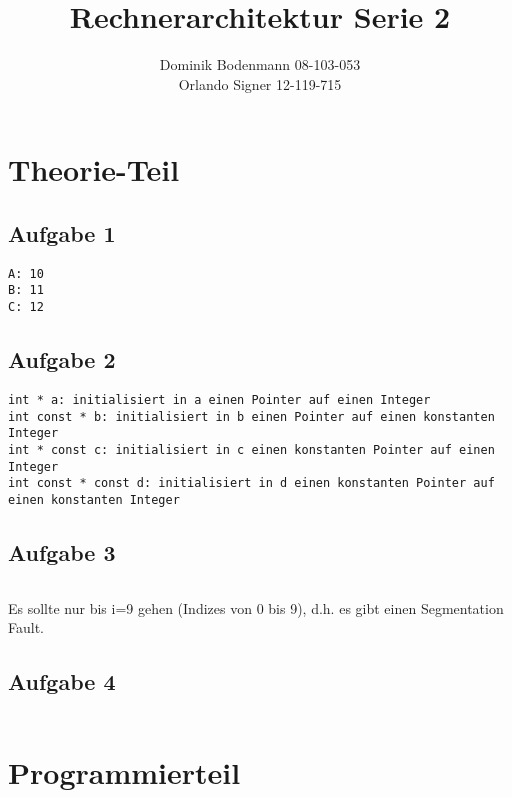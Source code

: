 \documentclass[a4paper,abstracton]{scrartcl}
\title{Rechnerarchitektur Serie 2}
\author{Dominik Bodenmann 08-103-053\\
	Orlando Signer 12-119-715\\}
\begin{document}
\maketitle

\section{Theorie-Teil}
\subsection{Aufgabe 1}
\begin{lstlisting}[caption=Ausgabe]
A: 10
B: 11
C: 12
\end{lstlisting}

\subsection{Aufgabe 2}
\begin{lstlisting}[caption=Eigenschaften]
int * a: initialisiert in a einen Pointer auf einen Integer
int const * b: initialisiert in b einen Pointer auf einen konstanten Integer
int * const c: initialisiert in c einen konstanten Pointer auf einen Integer
int const * const d: initialisiert in d einen konstanten Pointer auf einen konstanten Integer
\end{lstlisting}

\subsection{Aufgabe 3}
\begin{lstlisting}[caption=Problem]
\end {lstlisting}
Es sollte nur bis i=9 gehen (Indizes von 0 bis 9), d.h. es gibt einen Segmentation Fault.

\subsection{Aufgabe 4}
\begin{lstlisting}[caption=Ausgabe]

\end{lstlisting}


\section{Programmierteil}

\newpage

\end{document}
